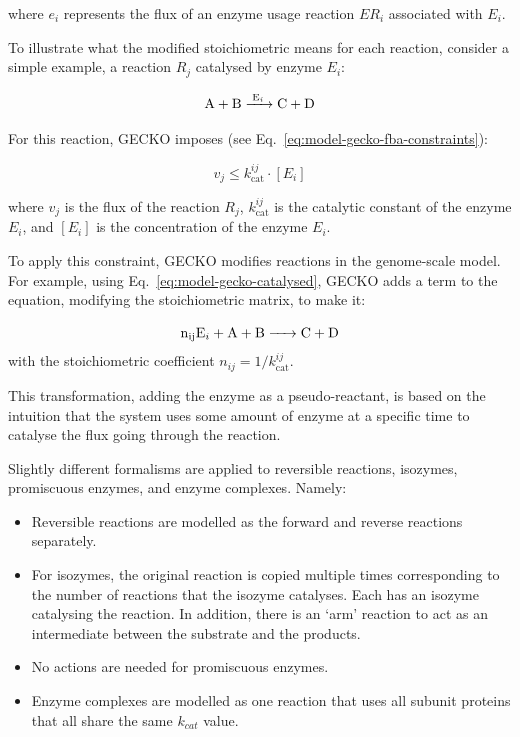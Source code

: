where $e_{i}$ represents the flux of an enzyme usage reaction $ER_{i}$ associated with $E_{i}$.

To illustrate what the modified stoichiometric means for each reaction, consider a simple example, a reaction $R_{j}$ catalysed by enzyme $E_{i}$:

\begin{equation}
  \ce{ A + B ->[E_{i}] C + D }
  \label{eq:model-gecko-catalysed}
\end{equation}

For this reaction, GECKO imposes (see Eq.\ \ref{eq:model-gecko-fba-constraints}):

\begin{equation}
  v_{j} \leq k_{\mathrm{cat}}^{ij} \cdot [E_{i}]
  \label{eq:model-gecko-kcat}
\end{equation}

where $v_{j}$ is the flux of the reaction $R_{j}$, $k_{\mathrm{cat}}^{ij}$ is the catalytic constant of the enzyme $E_{i}$, and $[E_{i}]$ is the concentration of the enzyme $E_{i}$.

To apply this constraint, GECKO modifies reactions in the genome-scale model.
For example, using Eq.\ \ref{eq:model-gecko-catalysed},
GECKO adds a term to the equation, modifying the stoichiometric matrix, to make it:

\begin{equation}
  \ce{ n_{ij}E_{i} + A + B -> C + D }
  \label{eq:model-gecko-catalysed-formalism}
\end{equation}
with the stoichiometric coefficient $n_{ij} = 1/k_{\mathrm{cat}}^{ij}$.

This transformation, adding the enzyme as a pseudo-reactant, is based on the intuition that the system uses some amount of enzyme at a specific time to catalyse the flux going through the reaction.

Slightly different formalisms are applied to reversible reactions, isozymes, promiscuous enzymes, and enzyme complexes.
Namely:
\begin{itemize}
  \item Reversible reactions are modelled as the forward and reverse reactions separately.
  \item For isozymes, the original reaction is copied multiple times corresponding to the number of reactions that the isozyme catalyses.
        Each has an isozyme catalysing the reaction.
        In addition, there is an `arm' reaction to act as an intermediate between the substrate and the products.
  \item No actions are needed for promiscuous enzymes.
  \item Enzyme complexes are modelled as one reaction that uses all subunit proteins that all share the same $k_{cat}$ value.
\end{itemize}

